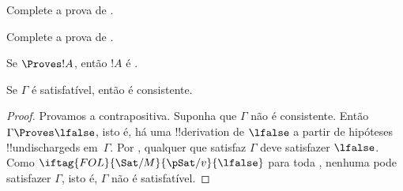 \documentclass[../../../include/open-logic-section]{subfiles}
\begin{document}
\begin{prob}
Complete a prova de .
\end{prob}
\tagendprob

\begin{prob}
Complete a prova de .
\end{prob}
\tagendprob

\begin{cor}
Se $\Proves !A$, então $!A$ é .
\end{cor}

\begin{cor}
Se $\Gamma$ é satisfatível, então é consistente.
\end{cor}

\begin{proof}
Provamos a contrapositiva.  Suponha que $\Gamma$ não é consistente.
Então $\Gamma \Proves \lfalse$, isto é, há uma !!{derivation} de
$\lfalse$ a partir de hipóteses !!{undischarged}s em~$\Gamma$. Por
, qualquer
que satisfaz $\Gamma$ deve satisfazer $\lfalse$.  Como
$\iftag{FOL}{\Sat/{M}}{\pSat/{v}}{\lfalse}$ para toda
,
nenhuma  pode satisfazer $\Gamma$,
isto é, $\Gamma$ não é satisfatível.
\end{proof}
\end{document}
